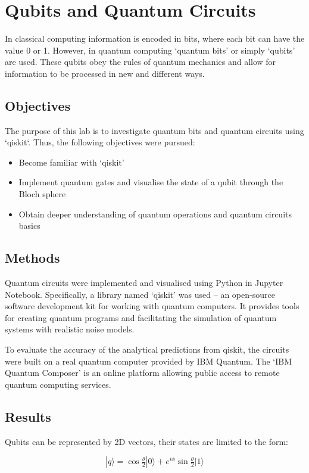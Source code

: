\renewcommand{\chaptername}{March 8th: Lab}
\chapter{Qubits and Quantum Circuits}

In classical computing information is encoded in bits, where each bit can have the value 0 or 1. However, in quantum computing `quantum bits' or simply `qubits' are used. These qubits obey the rules of quantum mechanics and allow for information to be processed in new and different ways.

\section{Objectives}
The purpose of this lab is to investigate quantum bits and quantum circuits using `qiskit`. Thus, the following objectives were pursued:
\begin{itemize}
    \item Become familiar with `qiskit'
    \item Implement quantum gates and visualise the state of a qubit through the Bloch sphere
    \item Obtain deeper understanding of quantum operations and quantum circuits basics
\end{itemize}

\section{Methods}
Quantum circuits were implemented and visualised using Python in Jupyter Notebook. Specifically, a library named `qiskit' was used -- an open-source software development kit for working with quantum computers. It provides tools for creating quantum programs and facilitating the simulation of quantum systems with realistic noise models.

To evaluate the accuracy of the analytical predictions from qiskit, the circuits were built on a real quantum computer provided by IBM Quantum. The `IBM Quantum Composer' is an online platform allowing public access to remote quantum computing services.

\section{Results}
Qubits can be represented by 2D vectors, their states are limited to the form:

$$ |q\rangle = \cos{\tfrac{\theta}{2}}|0\rangle + e^{i\phi}\sin{\tfrac{\theta}{2}}|1\rangle $$

